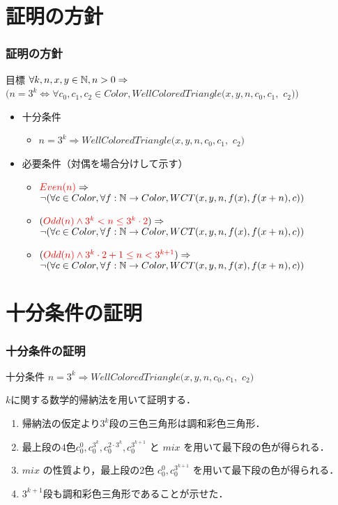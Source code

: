 \documentclass[dvipdfmx,cjk]{beamer}
\newcommand{\redt}[1]{\textcolor{red}{#1}}
\def\Color{\textit{Color}}
\def\WCT{\textit{WellColoredTriangle}}
\begin{document}
\section{証明の方針}

\begin{frame}
  \frametitle{証明の方針}
  \begin{block}{目標}
    $\forall k, n, x, y \in \mathbb{N}, n > 0 \Rightarrow$
    $(n = 3 ^ k \Leftrightarrow \forall c_0, c_1, c_2 \in \Color,\WCT(x,y,n,c_0,c_1,$ $c_2))$ 
  \end{block}
  \begin{itemize}
  \item
    十分条件
    \begin{itemize}
    \item
      $n = 3 ^ k \Rightarrow \WCT(x,y,n,c_0,c_1,$ $c_2)$
    \end{itemize}
    \vfill
  \item
    必要条件（対偶を場合分けして示す）
    \begin{itemize}
    \item
      $\redt{Even(n)} \Imp$ \\
      $\lnot (\forall c \in Color, \forall f : \mathbb{N} \to Color, WCT(x,y,n,f(x),f(x+n),c))$
    \item 
      $(\redt{Odd(n) \land 3^k < n \leq 3^k \cdot 2}) \Imp$ \\
      $ \lnot (\forall c \in Color, \forall f : \mathbb{N} \to Color, WCT(x,y,n,f(x),f(x+n),c))$
    \item 
      $(\redt{Odd(n) \land 3^k \cdot 2 + 1 \leq n < 3^{k+1}}) \Imp$ \\
      $\lnot (\forall c \in Color, \forall f : \mathbb{N} \to Color, WCT(x,y,n,f(x),f(x+n),c))$
    \end{itemize}
  \end{itemize}
\end{frame}


\section{十分条件の証明}
\begin{frame}
  \frametitle{十分条件の証明}
  \begin{block}{十分条件}
    $n = 3 ^ k \Rightarrow \WCT(x,y,n,c_0,c_1,$ $c_2)$
  \end{block}
  {\small
    \vfill
    \begin{center}
    
    \end{center}
    $k$に関する数学的帰納法を用いて証明する．
    \begin{enumerate}
    \item
      帰納法の仮定より$3^k$段の三色三角形は調和彩色三角形．
    \item
      最上段の$4$色$c^0_0, c^{3^{k}}_0, c^{2\cdot3^{k}}_0, c^{3^{k+1}}_0$ と $mix$ を用いて最下段の色が得られる．
    \item
      $mix$ の性質より，最上段の$2$色 $c^0_0, c^{3^{k+1}}_0$ を用いて最下段の色が得られる．
    \item
      $3^{k+1}$段も調和彩色三角形であることが示せた．
    \end{enumerate}
  } 
\end{frame}
\end{document}
